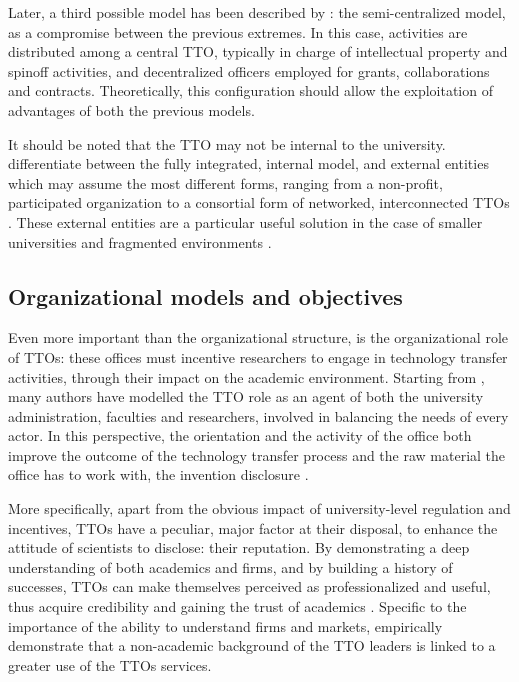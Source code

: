 Later, a third possible model has been described by \citet{Brescia2016}: the semi-centralized model, as a compromise between the previous extremes. In this case, activities are distributed among a central TTO, typically in charge of intellectual property and spinoff activities, and decentralized officers employed for grants, collaborations and contracts. Theoretically, this configuration should allow the exploitation of advantages of both the previous models. 

It should be noted that the TTO may not be internal to the university. \citet{Fisher2002} differentiate between the fully integrated, internal model, and external entities which may assume the most different forms, ranging from a non-profit, participated organization to a consortial form of networked, interconnected TTOs \citep{Brescia2016}. These external entities are a particular useful solution in the case of smaller universities and fragmented environments \citep{Debackere2005}.

\subsection{Organizational models and objectives}

Even more important than the organizational structure, is the organizational role of TTOs: these offices must incentive researchers to engage in technology transfer activities, through their impact on the academic environment. Starting from \citet{Jensen1998}, many authors have modelled the TTO role as an agent of both the university administration, faculties and researchers, involved in balancing the needs of every actor. In this perspective, the orientation and the activity of the office both improve the outcome of the technology transfer process and the raw material the office has to work with, the invention disclosure \citep{Siegel2007}. 

More specifically, apart from the obvious impact of university-level regulation and incentives, TTOs have a peculiar, major factor at their disposal, to enhance the attitude of scientists to disclose: their reputation. By demonstrating a deep understanding of both academics and firms, and by building a history of successes, TTOs can make themselves perceived as professionalized and useful, thus acquire credibility and gaining the trust of academics \citep{OwenSmith2001}. Specific to the importance of the ability to understand firms and markets, \citet{Muscio2010} empirically demonstrate that a non-academic background of the TTO leaders is linked to a greater use of the TTOs services.

